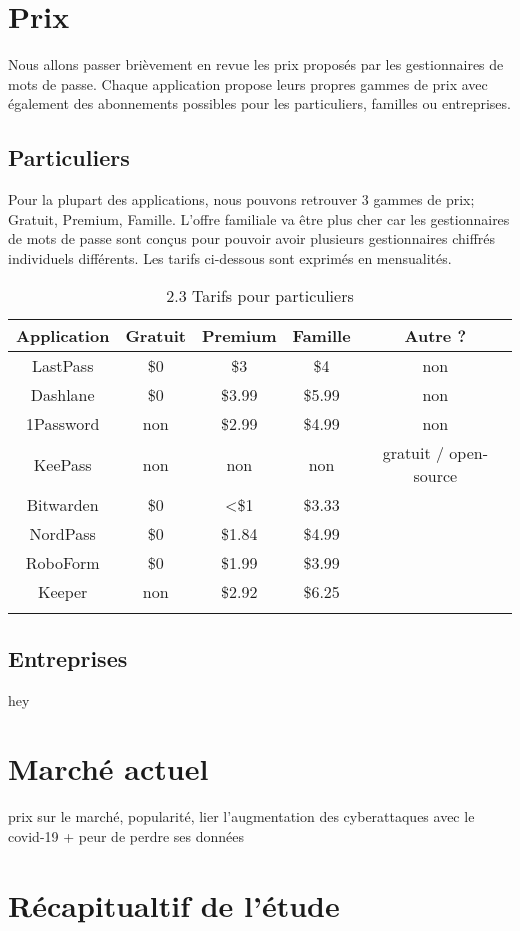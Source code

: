 \section{Prix}
Nous allons passer brièvement en revue les prix proposés par les gestionnaires de mots de passe. Chaque application propose leurs propres gammes de prix avec également des abonnements possibles pour les particuliers, familles ou entreprises. 
\subsection{Particuliers}
Pour la plupart des applications, nous pouvons retrouver 3 gammes de prix; Gratuit, Premium, Famille. L'offre familiale va être plus cher car les gestionnaires de mots de passe sont conçus pour pouvoir avoir plusieurs gestionnaires chiffrés individuels différents. 
Les tarifs ci-dessous sont exprimés en mensualités. \\
\begin{longtable}[h]{|c|c|c|c|c|}
    \hline
	Application & Gratuit & Premium & Famille & Autre ? \\
	\hline
	LastPass & \$0 & \$3 & \$4 & non \\
	\hline
	Dashlane & \$0 & \$3.99 & \$5.99 &  non \\
	\hline
	1Password & non & \$2.99 & \$4.99 & non \\
	\hline
	KeePass & non & non & non & gratuit / open-source  \\
	\hline
	Bitwarden & \$0 & <\$1 & \$3.33 &  \\
	\hline
	NordPass & \$0 & \$1.84 & \$4.99 &  \\
	\hline
	RoboForm & \$0 & \$1.99 & \$3.99 &   \\
	\hline
	Keeper & non & \$2.92 & \$6.25 &   \\
	\hline
    \caption{2.3 Tarifs pour particuliers}
\end{longtable}
\subsection{Entreprises}
hey 
\section{Marché actuel}
prix sur le marché, popularité, lier l'augmentation des cyberattaques avec le covid-19 + peur de perdre ses données
\section{Récapitualtif de l'étude}
